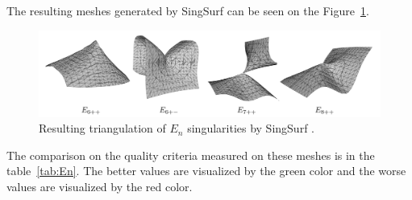     The resulting meshes generated by SingSurf 
can be seen on the Figure~\ref{img:70}.
\begin{figure}[h!]
    \centerline{\includegraphics[scale=0.5]{images/img70}}
    \caption[Resulting triangulation of $E_{n}$ singularities by SingSurf]
    {Resulting triangulation of $E_{n}$ singularities by SingSurf \cite{morris2003client}.}
    \label{img:70}
\end{figure}

The comparison on the quality criteria measured on these meshes 
is in the table~\ref{tab:En}. The better values are visualized
by the green color and the worse values are visualized by the red 
color.

